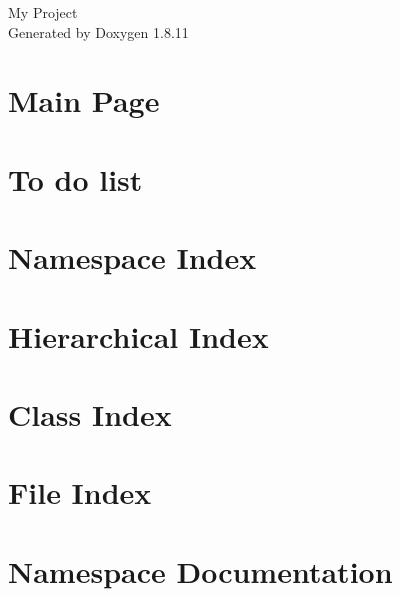 \documentclass[twoside]{book}
\newcommand{\+}{\discretionary{\mbox{\scriptsize$\hookleftarrow$}}{}{}}
\newcommand{\clearemptydoublepage}{%
  \newpage{\pagestyle{empty}\cleardoublepage}%
}
\begin{document}
\hypersetup{pageanchor=false,
             bookmarksnumbered=true,
             pdfencoding=unicode
            }
\begin{titlepage}
\vspace*{7cm}
\begin{center}%
{\Large My Project }\\
\vspace*{1cm}
{\large Generated by Doxygen 1.8.11}\\
\end{center}
\end{titlepage}
\clearemptydoublepage
\tableofcontents
\clearemptydoublepage
{}
\hypersetup{pageanchor=true}

\chapter{Main Page}
\label{index}\hypertarget{index}{}
\chapter{To do list}
\label{todo}
\hypertarget{todo}{}

\chapter{Namespace Index}

\chapter{Hierarchical Index}

\chapter{Class Index}

\chapter{File Index}

\chapter{Namespace Documentation}




\end{document}
